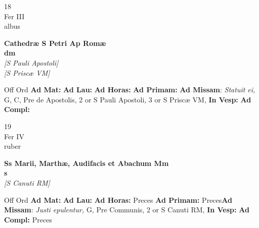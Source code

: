 \documentclass[10pt, openany]{book}
\begin{document}
    \begin{center}
        \begin{minipage}{3.5in}
            \vspace{2em}
            \begin{minipage}{0.5in}
                {\Huge 18} \\
                {\normalsize Fer III} \\
                {\normalsize albus}
            \end{minipage}
            \begin{minipage}{3.0in}
                \textbf{ \large Cathedræ S Petri Ap Romæ \\
                \textnormal{\normalsize dm}} \\ \textit{[S Pauli Apostoli]} \\ \textit{[S Priscæ VM]} \\ 
            \end{minipage}
            \begin{justify}Off Ord
                \textbf{Ad Mat: }
                \textbf{Ad Lau: }
                \textbf{Ad Horas: }
                \textbf{Ad Primam: }\textbf{Ad Missam}: \textit{Statuit ei,} G, C, Pre de Apostolis, 2 or S Pauli Apostoli, 3 or S Priscæ VM,  
                \textbf{In Vesp: }
                \textbf{Ad Compl: }
            \end{justify}
        \end{minipage}
    \end{center}

    \begin{center}
        \begin{minipage}{3.5in}
            \vspace{2em}
            \begin{minipage}{0.5in}
                {\Huge 19} \\
                {\normalsize Fer IV} \\
                {\normalsize ruber}
            \end{minipage}
            \begin{minipage}{3.0in}
                \textbf{ \large Ss Marii, Marthæ, Audifacis et Abachum Mm \\
                \textnormal{\normalsize s}} \\ \textit{[S Canuti RM]} \\ 
            \end{minipage}
            \begin{justify}Off Ord
                \textbf{Ad Mat: }
                \textbf{Ad Lau: }
                \textbf{Ad Horas: }Preces
                \textbf{Ad Primam: }Preces\textbf{Ad Missam}: \textit{Justi epulentur,} G, Pre Communis, 2 or S Canuti RM,  
                \textbf{In Vesp: }
                \textbf{Ad Compl: }Preces
            \end{justify}
        \end{minipage}
    \end{center}
\end{document}

